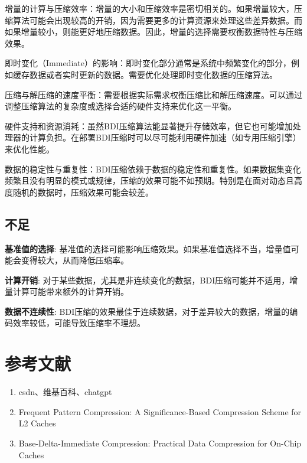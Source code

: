 \documentclass[12pt]{article}
\begin{document}
增量的计算与压缩效率：增量的大小和压缩效率是密切相关的。如果增量较大，压缩算法可能会出现较高的开销，因为需要更多的计算资源来处理这些差异数据。而如果增量较小，则能更好地压缩数据。因此，增量的选择需要权衡数据特性与压缩效果。

即时变化（Immediate）的影响：即时变化部分通常是系统中频繁变化的部分，例如缓存数据或者实时更新的数据。需要优化处理即时变化数据的压缩算法。

压缩与解压缩的速度平衡：需要根据实际需求权衡压缩比和解压缩速度。可以通过调整压缩算法的复杂度或选择合适的硬件支持来优化这一平衡。

硬件支持和资源消耗：虽然BDI压缩算法能显著提升存储效率，但它也可能增加处理器的计算负担。在部署BDI压缩时可以尽可能利用硬件加速（如专用压缩引擎）来优化性能。

数据的稳定性与重复性：BDI压缩依赖于数据的稳定性和重复性。如果数据集变化频繁且没有明显的模式或规律，压缩的效果可能不如预期。特别是在面对动态且高度随机的数据时，压缩效果可能会较差。

\subsection{不足}

\textbf{基准值的选择}: 基准值的选择可能影响压缩效果。如果基准值选择不当，增量值可能会变得较大，从而降低压缩率。

\textbf{计算开销}: 对于某些数据，尤其是非连续变化的数据，BDI压缩可能并不适用，增量计算可能带来额外的计算开销。

\textbf{数据不连续性}: BDI压缩的效果最佳于连续数据，对于差异较大的数据，增量的编码效率较低，可能导致压缩率不理想。

\section{参考文献}
\begin{enumerate}
\item csdn、维基百科、chatgpt
\item Frequent Pattern Compression: A Signiﬁcance-Based Compression Scheme for L2 Caches
\item Base-Delta-Immediate Compression: Practical Data Compression for
On-Chip Caches
\end{enumerate}
\end{document}
